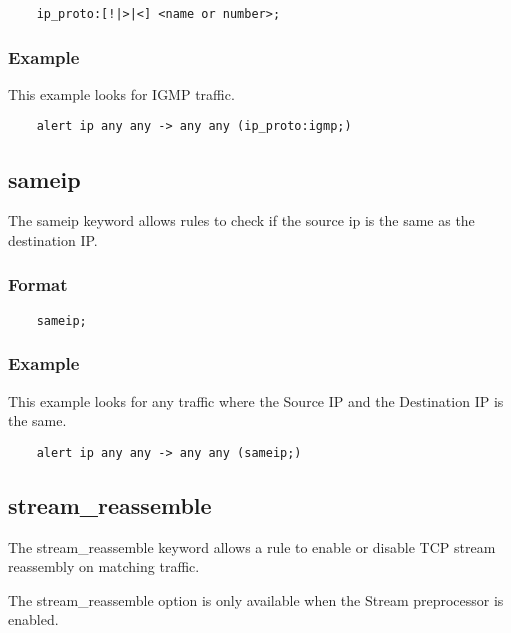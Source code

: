 \documentclass[english]{report}
\newenvironment{note}{
\samepage
    \vspace{10pt}{\textsf{
        {\hspace{7pt}\Huge{$\triangle$\hspace{-12.5pt}{\Large{$^!$}}}}\hspace{5pt}
        {\Large{NOTE}}
    }
    }
   \begin{center}
    \par\vspace{-17pt}

    \begin{lrbox}{\savepar}
    \begin{minipage}[r]{6in}
}
{
    \end{minipage}
    \end{lrbox}
    \fbox{
        \usebox{
            \savepar
	}
    }
    \par\vskip10pt
    \end{center}
}
\newenvironment{note}{
        \begin{rawhtml}
        <p><table border="1"><tr><td><b>
        Note:&nbsp;&nbsp;</b>
        \end{rawhtml}
}{
        \begin{rawhtml}
        </b></td></tr></table></p>
        \end{rawhtml}
}
\begin{document}
\begin{verbatim}
    ip_proto:[!|>|<] <name or number>;
\end{verbatim}

\subsubsection{Example}

This example looks for IGMP traffic.

\begin{verbatim}
    alert ip any any -> any any (ip_proto:igmp;)
\end{verbatim}

\subsection{sameip}

The sameip keyword allows rules to check if the source ip is the same as the
destination IP.

\subsubsection{Format}

\begin{verbatim}
    sameip;
\end{verbatim}

\subsubsection{Example}

This example looks for any traffic where the Source IP and the Destination IP
is the same.

\begin{verbatim}
    alert ip any any -> any any (sameip;)
\end{verbatim}

\subsection{stream\_reassemble}

The stream\_reassemble keyword allows a rule to enable or disable TCP stream reassembly
on matching traffic.

\begin{note}

The stream\_reassemble option is only available when the Stream preprocessor is
enabled.

\end{note}
\end{document}
